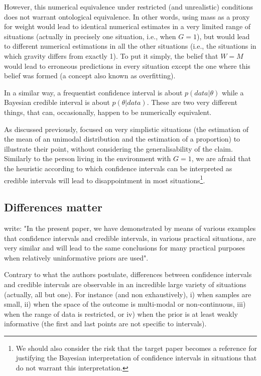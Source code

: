 \documentclass[a4paper,man,natbib,floatsintext,donotrepeattitle]{apa6}
\begin{document}
However, this numerical equivalence under restricted (and unrealistic) conditions does not warrant ontological equivalence. In other words, using mass as a proxy for weight would lead to identical numerical estimates in a very limited range of situations (actually in precisely one situation, i.e., when $G = 1$), but would lead to different numerical estimations in all the other situations (i.e., the situations in which gravity differs from exactly 1). To put it simply, the belief that $W = M$ would lead to erroneous predictions in every situation except the one where this belief was formed (a concept also known as overfitting).

In a similar way, a frequentist confidence interval is about $p(data|\theta)$ while a Bayesian credible interval is about $p(\theta|data)$. These are two very different things, that can, occasionally, happen to be numerically equivalent.

As discussed previously, \cite{albers_credible_2018} focused on very simplistic situations (the estimation of the mean of an unimodal distribution and the estimation of a proportion) to illustrate their point, without considering the generalisability of the claim. Similarly to the person living in the environment with $G = 1$, we are afraid that the heuristic according to which confidence intervals can be interpreted as credible intervals will lead to disappointment in most situations\footnote{We should also consider the risk that the target paper becomes a reference for justifying the Bayesian interpretation of confidence intervals in situations that do not warrant this interpretation.}.

\subsection{Differences matter}

\cite{albers_credible_2018} write: "In the present paper, we have demonstrated by means of various examples that confidence intervals and credible intervals, in various practical situations, are very similar and will lead to the same conclusions for many practical purposes when relatively uninformative priors are used".

Contrary to what the authors postulate, differences between confidence intervals and credible intervals are observable in an incredible large variety of situations (actually, all but one). For instance (and non exhaustively), i) when samples are small, ii) when the space of the outcome is multi-modal or non-continuous, iii) when the range of data is restricted, or iv) when the prior is at least weakly informative (the first and last points are not specific to intervals).
\end{document}
